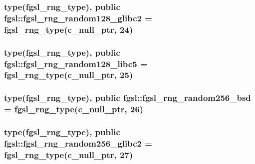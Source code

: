 \subsubsection[{fgsl\+\_\+rng\+\_\+random128\+\_\+glibc2}]{\setlength{\rightskip}{0pt plus 5cm}type({\bf fgsl\+\_\+rng\+\_\+type}), public fgsl\+::fgsl\+\_\+rng\+\_\+random128\+\_\+glibc2 = {\bf fgsl\+\_\+rng\+\_\+type}(c\+\_\+null\+\_\+ptr, 24)}\label{namespacefgsl_aa3d875270ff8191378a356c1b7aadc43}
\hypertarget{namespacefgsl_a49f71c990dc8dddacbdcdc1a012c4654}{}
\subsubsection[{fgsl\+\_\+rng\+\_\+random128\+\_\+libc5}]{\setlength{\rightskip}{0pt plus 5cm}type({\bf fgsl\+\_\+rng\+\_\+type}), public fgsl\+::fgsl\+\_\+rng\+\_\+random128\+\_\+libc5 = {\bf fgsl\+\_\+rng\+\_\+type}(c\+\_\+null\+\_\+ptr, 25)}\label{namespacefgsl_a49f71c990dc8dddacbdcdc1a012c4654}
\hypertarget{namespacefgsl_aa0a98fef28a7dc6e538ab97f5f07fc22}{}
\subsubsection[{fgsl\+\_\+rng\+\_\+random256\+\_\+bsd}]{\setlength{\rightskip}{0pt plus 5cm}type({\bf fgsl\+\_\+rng\+\_\+type}), public fgsl\+::fgsl\+\_\+rng\+\_\+random256\+\_\+bsd = {\bf fgsl\+\_\+rng\+\_\+type}(c\+\_\+null\+\_\+ptr, 26)}\label{namespacefgsl_aa0a98fef28a7dc6e538ab97f5f07fc22}
\hypertarget{namespacefgsl_aca7a71613cf5e355ebfe501bd30a0062}{}
\subsubsection[{fgsl\+\_\+rng\+\_\+random256\+\_\+glibc2}]{\setlength{\rightskip}{0pt plus 5cm}type({\bf fgsl\+\_\+rng\+\_\+type}), public fgsl\+::fgsl\+\_\+rng\+\_\+random256\+\_\+glibc2 = {\bf fgsl\+\_\+rng\+\_\+type}(c\+\_\+null\+\_\+ptr, 27)}\label{namespacefgsl_aca7a71613cf5e355ebfe501bd30a0062}
\hypertarget{namespacefgsl_a07865f4f3a0cd07f3e922da1b3616e68}{}

